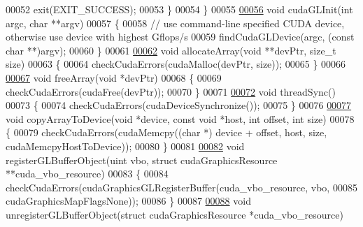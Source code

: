 \begin{DoxyCode}
00052             exit(EXIT\_SUCCESS);
00053         \}
00054     \}
00055 
\hypertarget{particle_system__cuda_8cu_source_l00056}{}\hyperlink{particle_system__cuda_8cu_a4e20ffdf94c8d60a5c32ecde149c8554}{00056}     \textcolor{keywordtype}{void} cudaGLInit(\textcolor{keywordtype}{int} argc, \textcolor{keywordtype}{char} **argv)
00057     \{
00058         \textcolor{comment}{// use command-line specified CUDA device, otherwise use device with highest Gflops/s}
00059         findCudaGLDevice(argc, (\textcolor{keyword}{const} \textcolor{keywordtype}{char} **)argv);
00060     \}
00061 
\hypertarget{particle_system__cuda_8cu_source_l00062}{}\hyperlink{particle_system__cuda_8cu_a781553d31085a23b6d0be9d19982759a}{00062}     \textcolor{keywordtype}{void} allocateArray(\textcolor{keywordtype}{void} **devPtr, size\_t size)
00063     \{
00064         checkCudaErrors(cudaMalloc(devPtr, size));
00065     \}
00066 
\hypertarget{particle_system__cuda_8cu_source_l00067}{}\hyperlink{particle_system__cuda_8cu_a2946519c8d9c4f8ebf552bf044821ea9}{00067}     \textcolor{keywordtype}{void} freeArray(\textcolor{keywordtype}{void} *devPtr)
00068     \{
00069         checkCudaErrors(cudaFree(devPtr));
00070     \}
00071 
\hypertarget{particle_system__cuda_8cu_source_l00072}{}\hyperlink{particle_system__cuda_8cu_af59f4c114812beed29874c0a1a31519d}{00072}     \textcolor{keywordtype}{void} threadSync()
00073     \{
00074         checkCudaErrors(cudaDeviceSynchronize());
00075     \}
00076 
\hypertarget{particle_system__cuda_8cu_source_l00077}{}\hyperlink{particle_system__cuda_8cu_ac4d4ecd921dbed6c2deef639ca295374}{00077}     \textcolor{keywordtype}{void} copyArrayToDevice(\textcolor{keywordtype}{void} *device, \textcolor{keyword}{const} \textcolor{keywordtype}{void} *host, \textcolor{keywordtype}{int} offset, \textcolor{keywordtype}{int} size)
00078     \{
00079         checkCudaErrors(cudaMemcpy((\textcolor{keywordtype}{char} *) device + offset, host, size, cudaMemcpyHostToDevice));
00080     \}
00081 
\hypertarget{particle_system__cuda_8cu_source_l00082}{}\hyperlink{particle_system__cuda_8cu_a4386a84282ceeaba09939817aa2a9c24}{00082}     \textcolor{keywordtype}{void} registerGLBufferObject(uint vbo, \textcolor{keyword}{struct} cudaGraphicsResource **cuda\_vbo\_resource)
00083     \{
00084         checkCudaErrors(cudaGraphicsGLRegisterBuffer(cuda\_vbo\_resource, vbo,
00085                                                      cudaGraphicsMapFlagsNone));
00086     \}
00087 
\hypertarget{particle_system__cuda_8cu_source_l00088}{}\hyperlink{particle_system__cuda_8cu_a9afef8c00ca779aae2d7484b45bce34c}{00088}     \textcolor{keywordtype}{void} unregisterGLBufferObject(\textcolor{keyword}{struct} cudaGraphicsResource *cuda\_vbo\_resource)

\end{DoxyCode}
